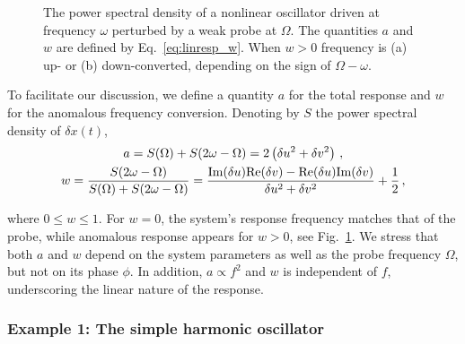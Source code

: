 \begin{figure}
	\centering
	
	\caption{The power spectral density of a nonlinear oscillator driven at frequency $\omega$ perturbed by a weak probe at $\Omega$. The quantities $a$ and $w$ are defined by Eq.~\eqref{eq:linresp_w}. When $w > 0$ frequency is (a) up- or (b) down-converted, depending on the sign of $\Omega - \omega$.}
	\label{fig:linresp_w_illustr}
\end{figure}

To facilitate our discussion, we define a quantity $a$ for the total response and $w$ for the anomalous frequency conversion. Denoting by $S$ the power spectral density of $\delta x(t)$,
\begin{equation} \label{eq:linresp_w}
\begin{gathered}
a = {S(\Omega) + S(2\omega - \Omega)} =  2 \left(\delta u^2 + \delta v^2 \right) \,, \\ \vspace*{1.5mm} 
w = \frac{S(2\omega - \Omega)}{S(\Omega) + S(2\omega - \Omega)} = \frac{  \im{\delta u} \re{\delta v}  - \re{\delta u} \im{\delta v}}{\delta u^2 + \delta v^2} + \frac{1}{2} \,,
\end{gathered}
\end{equation}
where $0 \leq w \leq 1$. For $w=0$, the system's response frequency matches that of the probe, while anomalous response appears for $w > 0$, see Fig.~\ref{fig:linresp_w_illustr}. We stress that both $a$ and $w$ depend on the system parameters as well as the probe frequency $\Omega$, but not on its phase $\phi$. In addition, $a \propto f^2$ and $w$ is independent of $f$, underscoring the linear nature of the response.

\subsubsection{Example 1: The simple harmonic oscillator}


